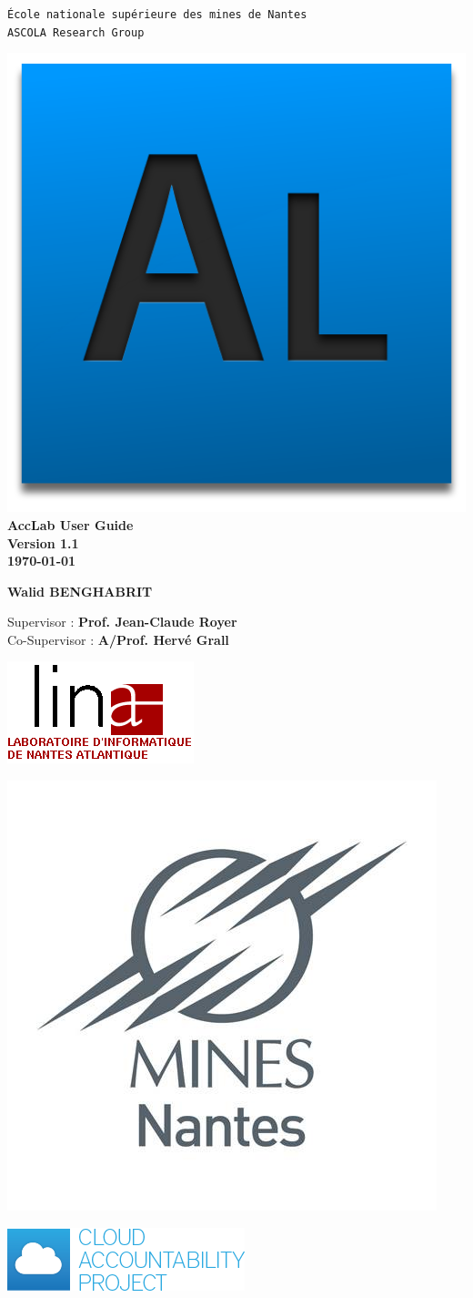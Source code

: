 \begin{titlepage}

\thispagestyle{empty}

\begin{center}
	\large{\texttt{École nationale supérieure des mines de Nantes}}\\
	\large{\texttt{ASCOLA Research Group}}
\end{center}

\noindent
\vspace{0.5cm}

\begin{center}
	\includegraphics[height=14ex,keepaspectratio,angle=20]{assets/acclab.png}
	\Huge{\textbf{AccLab User Guide}} \\ \vspace{0.5cm} \large{\textbf{Version 1.1}} \\
	\vspace{0.4cm}
	\large{\textbf{\today}}
	\normalsize
	\vspace{4.0cm}

	\begin{center}
	  \textbf{Walid BENGHABRIT}
	\end{center}

	\vspace{2mm}
	Supervisor : \textbf{Prof. Jean-Claude Royer} \\
	Co-Supervisor : \textbf{A/Prof. Hervé Grall}

\end{center}

\vspace{4.5cm}
\parbox{0.33\linewidth}{ \includegraphics[height=9ex,keepaspectratio]{assets/lina_logo.png}}
\parbox{0.33\linewidth}{ \includegraphics[height=15.7ex,keepaspectratio]{assets/enmLogo.jpg}}
\parbox{0.33\linewidth}{ \includegraphics[height=7.0ex,keepaspectratio]{assets/a4cloud.png}}

\end{titlepage}
